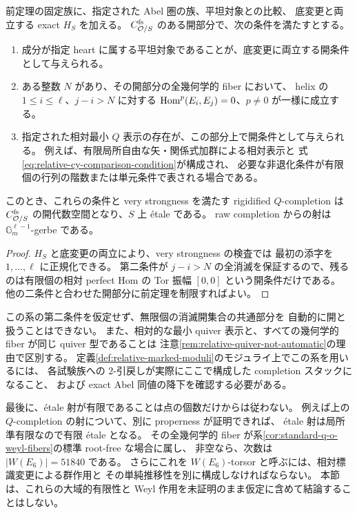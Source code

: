 \begin{corollary}
\label{cor:q-completion-etale-locus}
前定理の固定族に、指定された Abel 圏の族、平坦対象との比較、
底変更と両立する exact $H_S$ を加える。
$C^{\rm fs}_{\mathcal O/S}$ のある開部分で、次の条件を満たすとする。
\begin{enumerate}
\item 成分が指定 heart に属する平坦対象であることが、底変更に両立する開条件として与えられる。
\item ある整数 $N$ があり、その開部分の全幾何学的 fiber において、
helix の $1\le i\le\ell$、$j-i>N$ に対する
$\operatorname{Hom}^p(E_i,E_j)=0$、$p\ne0$ が一様に成立する。
\item 指定された相対最小 $Q$ 表示の存在が、この部分上で開条件として与えられる。
例えば、有限局所自由な矢・関係式加群による相対表示と
式\eqref{eq:relative-cy-comparison-condition}が構成され、
必要な非退化条件が有限個の行列の階数または単元条件で表される場合である。
\end{enumerate}
このとき、これらの条件と very strongness を満たす rigidified $Q$-completion は
$C^{\rm fs}_{\mathcal O/S}$ の開代数空間となり、$S$ 上 \'etale である。
raw completion からの射は $\mathbb G_m^{\ell-1}$-gerbe である。
\end{corollary}
\begin{proof}
$H_S$ と底変更の両立により、very strongness の検査では
最初の添字を $1,\ldots,\ell$ に正規化できる。
第二条件が $j-i>N$ の全消滅を保証するので、残るのは有限個の相対 perfect Hom の
Tor 振幅 $[0,0]$ という開条件だけである。
他の二条件と合わせた開部分に前定理を制限すればよい。
\end{proof}

この系の第二条件を仮定せず、無限個の消滅開集合の共通部分を
自動的に開と扱うことはできない。
また、相対的な最小 quiver 表示と、すべての幾何学的 fiber が同じ quiver 型であることは
注意\ref{rem:relative-quiver-not-automatic}の理由で区別する。
定義\ref{def:relative-marked-moduli}のモジュライ上でこの系を用いるには、
各試験族への $2$-引戻しが実際にここで構成した completion スタックになること、
および exact Abel 同値の降下を確認する必要がある。

最後に、\'etale 射が有限であることは点の個数だけからは従わない。
例えば上の $Q$-completion の射について、別に properness が証明できれば、
\'etale 射は局所準有限なので有限 \'etale となる。
その全幾何学的 fiber が系\ref{cor:standard-q-o-weyl-fibers}の標準 root-free な場合に属し、
非空なら、次数は $|W(E_6)|=51840$ である。
さらにこれを $W(E_6)$-torsor と呼ぶには、相対標識変更による群作用と
その単純推移性を別に構成しなければならない。
本節は、これらの大域的有限性と Weyl 作用を未証明のまま仮定に含めて結論することはしない。
